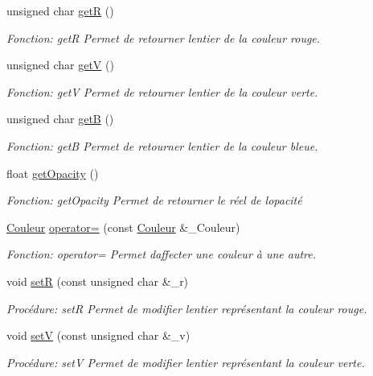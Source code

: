 \begin{DoxyCompactItemize}
unsigned char \hyperlink{classCouleur_aa3d10f39d94ed884dda69a2420cd3357}{getR} ()
\begin{DoxyCompactList}\small\item\em Fonction\+: getR Permet de retourner l\textquotesingle{}entier de la couleur rouge. \end{DoxyCompactList}\item 
unsigned char \hyperlink{classCouleur_a15c9bd61ea816ad1fb9a7e13806142c7}{getV} ()
\begin{DoxyCompactList}\small\item\em Fonction\+: getV Permet de retourner l\textquotesingle{}entier de la couleur verte. \end{DoxyCompactList}\item 
unsigned char \hyperlink{classCouleur_aab24066e81089a96d15bcb04aa2c77df}{getB} ()
\begin{DoxyCompactList}\small\item\em Fonction\+: getB Permet de retourner l\textquotesingle{}entier de la couleur bleue. \end{DoxyCompactList}\item 
float \hyperlink{classCouleur_afb394e815103a2245bc5c3b5b513f05b}{get\+Opacity} ()
\begin{DoxyCompactList}\small\item\em Fonction\+: get\+Opacity Permet de retourner le réel de l\textquotesingle{}opacité \end{DoxyCompactList}\item 
\hyperlink{classCouleur}{Couleur} \hyperlink{classCouleur_a939297e6a11ff80510d6acf02bfa3ac0}{operator=} (const \hyperlink{classCouleur}{Couleur} \&\+\_\+\+Couleur)
\begin{DoxyCompactList}\small\item\em Fonction\+: operator= Permet d\textquotesingle{}affecter une couleur à une autre. \end{DoxyCompactList}\item 
void \hyperlink{classCouleur_aeb7507061466c7c1e18d3b870f876ac0}{setR} (const unsigned char \&\+\_\+r)
\begin{DoxyCompactList}\small\item\em Procédure\+: setR Permet de modifier l\textquotesingle{}entier représentant la couleur rouge. \end{DoxyCompactList}\item 
void \hyperlink{classCouleur_a7aa9a8ce100008ef3551064b1c7bfe47}{setV} (const unsigned char \&\+\_\+v)
\begin{DoxyCompactList}\small\item\em Procédure\+: setV Permet de modifier l\textquotesingle{}entier représentant la couleur verte. \end{DoxyCompactList}\item 

\end{DoxyCompactItemize}
